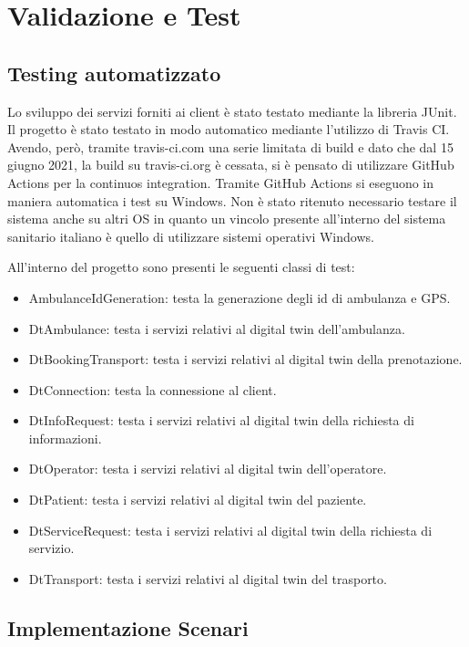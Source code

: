 \documentclass[12pt]{article}
\begin{document}
\section{Validazione e Test}

\subsection{Testing automatizzato}
Lo sviluppo dei servizi forniti ai client è stato testato mediante la libreria JUnit. 
Il progetto è stato testato in modo automatico mediante l'utilizzo di Travis CI. 
Avendo, però, tramite travis-ci.com una serie limitata di build e dato che dal 15 giugno 2021, la build su travis-ci.org è cessata, si è pensato di utilizzare GitHub Actions per la continuos integration.
Tramite GitHub Actions si eseguono in maniera automatica i test su Windows. Non è stato ritenuto necessario testare il sistema anche su altri OS in quanto un vincolo presente all'interno del sistema sanitario italiano è quello di utilizzare sistemi operativi Windows.

All'interno del progetto sono presenti le seguenti classi di test:
\begin{itemize}
    \item AmbulanceIdGeneration: testa la generazione degli id di ambulanza e GPS.
    \item DtAmbulance: testa i servizi relativi al digital twin dell'ambulanza.
    \item DtBookingTransport: testa i servizi relativi al digital twin della prenotazione.
    \item DtConnection: testa la connessione al client.
    \item DtInfoRequest: testa i servizi relativi al digital twin della richiesta di informazioni.
    \item DtOperator: testa i servizi relativi al digital twin dell'operatore.
    \item DtPatient: testa i servizi relativi al digital twin del paziente.
    \item DtServiceRequest: testa i servizi relativi al digital twin della richiesta di servizio.
    \item DtTransport: testa i servizi relativi al digital twin del trasporto.
\end{itemize}

\subsection{Implementazione Scenari}\label{sez62}
\end{document}
